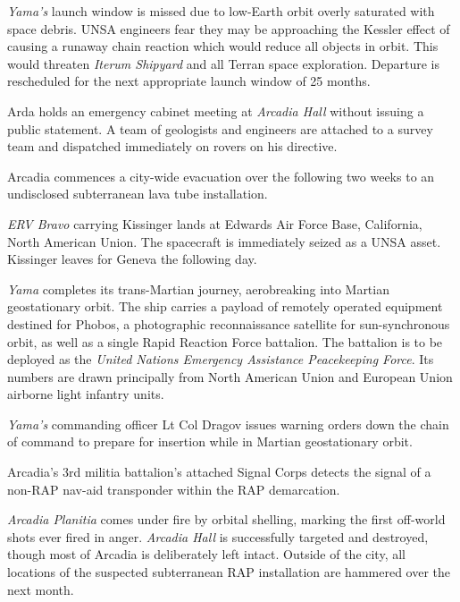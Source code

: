{\it Yama's} launch window is missed due to low-Earth orbit overly saturated with space debris. UNSA engineers fear they may be approaching the Kessler effect of causing a runaway chain reaction which would reduce all objects in orbit. This would threaten {\it Iterum Shipyard} and all Terran space exploration. Departure is rescheduled for the next appropriate launch window of 25 months.
\StopTimelineDate

Arda holds an emergency cabinet meeting at {\it Arcadia Hall} without issuing a public statement. A team of geologists and engineers are attached to a survey team and dispatched immediately on rovers on his directive.
\StopTimelineDate

Arcadia commences a city-wide evacuation over the following two weeks to an undisclosed subterranean lava tube installation.
\StopTimelineDate

{\it ERV Bravo} carrying Kissinger lands at Edwards Air Force Base, California, North American Union. The spacecraft is immediately seized as a UNSA asset. Kissinger leaves for Geneva the following day.
\StopTimelineDate

{\it Yama} completes its trans-Martian journey, aerobreaking into Martian geostationary orbit. The ship carries a payload of remotely operated equipment destined for Phobos, a photographic reconnaissance satellite for sun-synchronous orbit, as well as a single Rapid Reaction Force battalion. The battalion is to be deployed as the {\it United Nations Emergency Assistance Peacekeeping Force}. Its numbers are drawn principally from North American Union and European Union airborne light infantry units.
\StopTimelineDate

{\it Yama's} commanding officer Lt Col Dragov issues warning orders down the chain of command to prepare for insertion while in Martian geostationary orbit.
\StopTimelineDate

Arcadia's 3rd militia battalion's attached Signal Corps detects the signal of a non-RAP nav-aid transponder within the RAP demarcation.
\StopTimelineDate

{\it Arcadia Planitia} comes under fire by orbital shelling, marking the first off-world shots ever fired in anger. {\it Arcadia Hall} is successfully targeted and destroyed, though most of Arcadia is deliberately left intact. Outside of the city, all locations of the suspected subterranean RAP installation are hammered over the next month.

